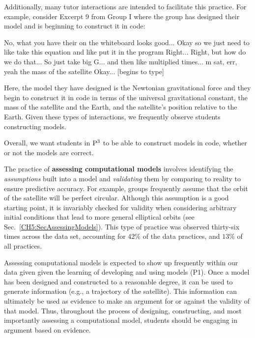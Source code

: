 \documentclass{msuphddissertation}
\begin{document}
\begin{doublespace}
Additionally, many tutor interactions are intended to facilitate this practice.  For example, consider Excerpt 9 from Group I where the group has designed their model and is beginning to construct it in code: \begin{description}
\TA No, what you have their {on the whiteboard} looks good...
\SD Okay so we just need to like take this equation and like
\SD put it in the program
\TA Right...
\SD Right, but how do we do that...
\SC So just take big G... and then like multiplied times...
\SC m sat, err, yeah the mass of the satellite
\SA Okay... [begins to type]
\end{description}  Here, the model they have designed is the Newtonian gravitational force and they begin to construct it in code in terms of the universal gravitational constant, the mass of the satellite and the Earth, and the satellite's position relative to the Earth.  Given these types of interactions, we frequently observe students constructing models.

Overall, we want students in ${\rm P}^{3}$ to be able to construct models in code, whether or not the models are correct.

The practice of \textbf{assessing computational models} involves identifying the \textit{assumptions} built into a model and \textit{validating} them by comparing to reality to ensure predictive accuracy.  For example, groups frequently assume that the orbit of the satellite will be perfect circular.  Although this assumption is a good starting point, it is invariably checked for validity when considering arbitrary initial conditions that lead to more general elliptical orbits (see Sec.~\ref{CH5:SecAssessingModels}).  This type of practice was observed thirty-six times across the data set, accounting for $42\%$ of the data practices, and $13\%$ of all practices.

Assessing computational models is expected to show up frequently within our data given given the learning of developing and using models (P1).  Once a model has been designed and constructed to a reasonable degree, it can be used to generate information (e.g., a trajectory of the satellite).  This information can ultimately be used as evidence to make an argument for or against the validity of that model.  Thus, throughout the process of designing, constructing, and most importantly assessing a computational model, students should be engaging in argument based on evidence.


\end{doublespace}
\end{document}
